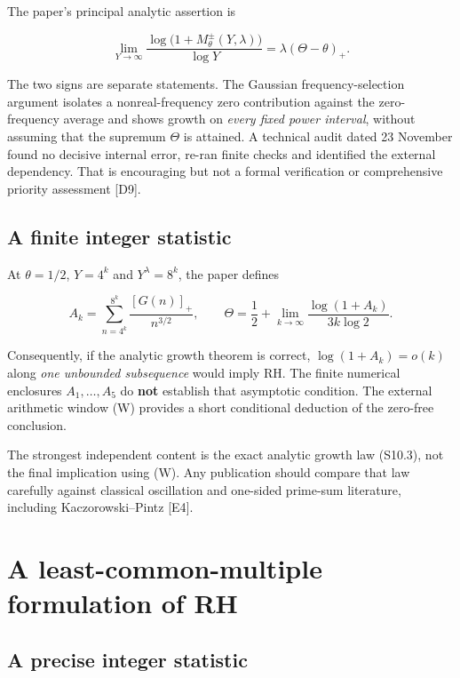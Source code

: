 \documentclass[
  10pt,
  a4paper,
  10pt,
  oneside,
  openany]{book}
\begin{document}
The paper's principal analytic assertion is

\[
\boxed{\quad
\lim_{Y\to\infty}
\frac{\log\bigl(1+M_\theta^\pm(Y,\lambda)\bigr)}{\log Y}
=\lambda(\Theta-\theta)_+.
\quad}
\tag{S10.3}\label{eq:S10.3}
\]

The two signs are separate statements. The Gaussian frequency-selection
argument isolates a nonreal-frequency zero contribution against the
zero-frequency average and shows growth on \emph{every fixed power
interval}, without assuming that the supremum \(\Theta\) is attained. A
technical audit dated 23 November found no decisive internal error,
re-ran finite checks and identified the external dependency. That is
encouraging but not a formal verification or comprehensive priority
assessment {[}D9{]}.

\subsection{A finite integer
statistic}\label{a-finite-integer-statistic}

At \(\theta=1/2\), \(Y=4^k\) and \(Y^\lambda=8^k\), the paper defines

\[
A_k=\sum_{n=4^k}^{8^k}
\frac{[G(n)]_+}{n^{3/2}},
\qquad
\Theta=\frac12+
\lim_{k\to\infty}\frac{\log(1+A_k)}{3k\log2}.
\tag{S10.4}\label{eq:S10.4}
\]

Consequently, if the analytic growth theorem is correct,
\(\log(1+A_k)=o(k)\) along \emph{one unbounded subsequence} would imply
RH. The finite numerical enclosures \(A_1,\ldots,A_5\) do \textbf{not}
establish that asymptotic condition. The external arithmetic window (W)
provides a short conditional deduction of the zero-free conclusion.

The strongest independent content is the exact analytic growth law
(S10.3), not the final implication using (W). Any publication should
compare that law carefully against classical oscillation and one-sided
prime-sum literature, including Kaczorowski--Pintz {[}E4{]}.

\section{A least-common-multiple formulation of
RH}\label{a-least-common-multiple-formulation-of-rh}

\subsection{A precise integer
statistic}\label{a-precise-integer-statistic}
\end{document}
